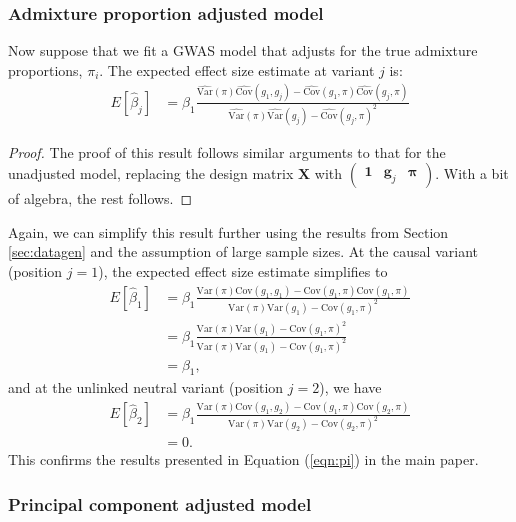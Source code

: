 \documentclass[12pt]{article}
\begin{document}
\subsubsection{Admixture proportion adjusted model}

Now suppose that we fit a GWAS model that adjusts for the true admixture proportions, $\pi_i$.
The expected effect size estimate at variant $j$ is:
\begin{align*}
E[\hat\beta_j] & = \beta_1 \frac{\widehat{\text{Var}}(\pi)\widehat{\text{Cov}}(g_{1},g_{j})-\widehat{\text{Cov}}(g_{1}, \pi) \widehat{\text{Cov}}(g_{j},\pi)}{\widehat{\text{Var}}(\pi)\widehat{\text{Var}}(g_{j})-\widehat{\text{Cov}}(g_{j},\pi)^2} 
\end{align*}

\begin{proof}
The proof of this result follows similar arguments to that for the unadjusted model, replacing the design matrix $\mathbf{X}$ with $\begin{pmatrix} \mathbf{1} & \mathbf{g}_j & \boldsymbol\pi \end{pmatrix}$. 
With a bit of algebra, the rest follows. 
\end{proof}


Again, we can simplify this result further using the results from Section \ref{sec:datagen} and the assumption of large sample sizes. 
At the causal variant (position $j=1$), the expected effect size estimate simplifies to
\begin{align*}
E[\hat\beta_1] & = \beta_1 \frac{\text{Var}(\pi)\text{Cov}(g_1,g_1)-\text{Cov}(g_1, \pi) \text{Cov}(g_1,\pi)}{\text{Var}(\pi)\text{Var}(g_1)-\text{Cov}(g_1,\pi)^2} \\
& =  \beta_1 \frac{\text{Var}(\pi)\text{Var}(g_1)-\text{Cov}(g_1, \pi) ^2}{\text{Var}(\pi)\text{Var}(g_1)-\text{Cov}(g_1,\pi)^2} \\
& = \beta_1,
\end{align*}
and at the unlinked neutral variant (position $j = 2$), we have
\begin{align*}
E[\hat\beta_2] & = \beta_1 \frac{\text{Var}(\pi)\text{Cov}(g_1,g_2)-\text{Cov}(g_1, \pi) \text{Cov}(g_2,\pi)}{\text{Var}(\pi)\text{Var}(g_2)-\text{Cov}(g_2,\pi)^2} \\
& = 0.
\end{align*}
This confirms the results presented in Equation (\ref{eqn:pi}) in the main paper.


\subsubsection{Principal component adjusted model}
\end{document}
